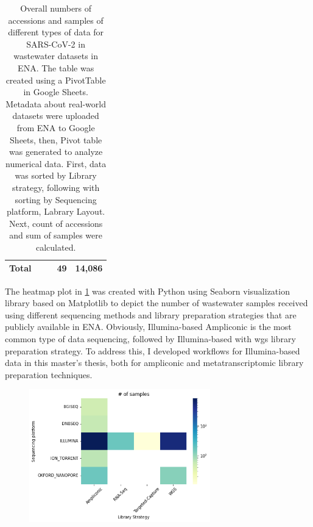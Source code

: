 \begin{table}[ht!]
\begin{tabular}{lllll}
                \textbf{Total}                 &  &             & \textbf{49}           & \textbf{14,086}\\ \hline
                \end{tabular}
                \caption{Overall numbers of accessions and samples of different types of data for SARS-CoV-2 in wastewater datasets in ENA. The table was created using a PivotTable in Google Sheets. Metadata about real-world datasets were uploaded from ENA to Google Sheets, then, Pivot table was generated to analyze numerical data. First, data was sorted by Library strategy, following with sorting by Sequencing platform, Labrary Layout. Next, count of accessions and sum of samples were calculated.} \label{tab:intro:ww-realdata}
            \end{table}
            
            The heatmap plot in \cref{fig:methods:data-heatmap} was created with Python using Seaborn visualization library \cite{waskom2021} based on Matplotlib \cite{hunter2007} to depict the number of wastewater samples received using different sequencing methods and library preparation strategies that are publicly available in ENA. Obviously, Illumina-based Ampliconic is the most common type of data sequencing, followed by Illumina-based with \acrshort{wgs} library preparation strategy. To address this, I developed workflows for Illumina-based data in this master's thesis, both for ampliconic and metatranscriptomic library preparation techniques.
            \begin{figure}[ht!]
            	\centering
                \includegraphics[width=0.7\textwidth]{figures/methods/datasets-heatmap.png}
                \label{fig:methods:data-heatmap}
            \end{figure}
       
